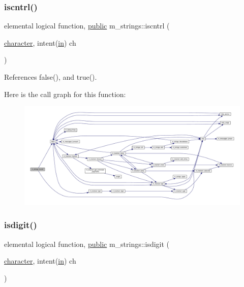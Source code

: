 \subsubsection{\texorpdfstring{iscntrl()}{iscntrl()}}
{\footnotesize\ttfamily elemental logical function, \hyperlink{M__stopwatch_83_8txt_a2f74811300c361e53b430611a7d1769f}{public} m\+\_\+strings\+::iscntrl (\begin{DoxyParamCaption}\item[{\hyperlink{option__stopwatch_83_8txt_abd4b21fbbd175834027b5224bfe97e66}{character}, intent(\hyperlink{M__journal_83_8txt_afce72651d1eed785a2132bee863b2f38}{in})}]{ch }\end{DoxyParamCaption})}



References false(), and true().

Here is the call graph for this function\+:
\nopagebreak
\begin{figure}[H]
\begin{center}
\leavevmode
\includegraphics[width=350pt]{namespacem__strings_a4821cb5a5c4024c9dc6dd159300034ca_cgraph}
\end{center}
\end{figure}
\mbox{\label{namespacem__strings_a9f5f98a6c93e21618a16d98a5de2debc}} 
\subsubsection{\texorpdfstring{isdigit()}{isdigit()}}
{\footnotesize\ttfamily elemental logical function, \hyperlink{M__stopwatch_83_8txt_a2f74811300c361e53b430611a7d1769f}{public} m\+\_\+strings\+::isdigit (\begin{DoxyParamCaption}\item[{\hyperlink{option__stopwatch_83_8txt_abd4b21fbbd175834027b5224bfe97e66}{character}, intent(\hyperlink{M__journal_83_8txt_afce72651d1eed785a2132bee863b2f38}{in})}]{ch }\end{DoxyParamCaption})}




